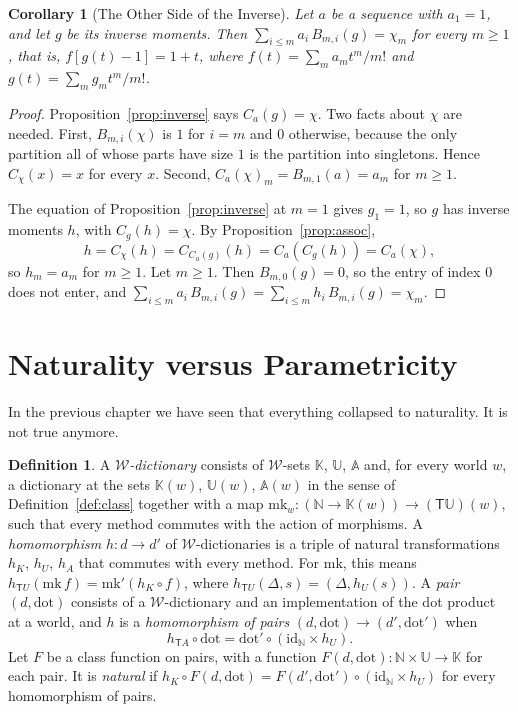 \documentclass[11pt,a4paper]{report}
\theoremstyle{plain}
\newtheorem{corollary}[theorem]{Corollary}
\theoremstyle{definition}
\newtheorem{definition}[theorem]{Definition}
\theoremstyle{remark}
\newcommand{\sK}{\mathbb{K}}
\newcommand{\sU}{\mathbb{U}}
\newcommand{\sA}{\mathbb{A}}
\newcommand{\NN}{\mathbb{N}}
\newcommand{\T}{\mathsf{T}}
\newcommand{\W}{\mathcal{W}}
\newcommand{\mk}{\mathrm{mk}}
\begin{document}
\begin{corollary}[The Other Side of the Inverse]
\label{cor:inverse-right}
Let $a$ be a sequence with $a_1 = 1$, and let $g$ be its inverse moments. Then
$\sum_{i \leq m} a_i\, B_{m,i}(g) = \chi_m$ for every $m \geq 1$, that is,
$f[g(t) - 1] = 1 + t$, where $f(t) = \sum_m a_m t^m / m!$ and
$g(t) = \sum_m g_m t^m / m!$.
\end{corollary}

\begin{proof}
Proposition~\ref{prop:inverse} says $C_a(g) = \chi$. Two facts about $\chi$ are
needed. First, $B_{m,i}(\chi)$ is $1$ for $i = m$ and $0$ otherwise, because the
only partition all of whose parts have size $1$ is the partition into singletons.
Hence $C_\chi(x) = x$ for every $x$. Second, $C_a(\chi)_m = B_{m,1}(a) = a_m$ for
$m \geq 1$.

The equation of Proposition~\ref{prop:inverse} at $m = 1$ gives $g_1 = 1$, so $g$
has inverse moments $h$, with $C_g(h) = \chi$. By Proposition~\ref{prop:assoc},
\[
  h = C_\chi(h) = C_{C_a(g)}(h) = C_a(C_g(h)) = C_a(\chi) ,
\]
so $h_m = a_m$ for $m \geq 1$. Let $m \geq 1$. Then $B_{m,0}(g) = 0$, so the entry
of index $0$ does not enter, and
$\sum_{i \leq m} a_i\, B_{m,i}(g) = \sum_{i \leq m} h_i\, B_{m,i}(g) = \chi_m$.
\end{proof}

\section{Naturality versus Parametricity}
\label{sec:separation}

In the previous chapter we have seen that everything collapsed to naturality. It 
is not true anymore.

\begin{definition}
\label{def:wdict}
A \emph{$\W$-dictionary} consists of $\W$-sets $\sK$, $\sU$, $\sA$ and, for
every world $w$, a dictionary at the sets $\sK(w)$, $\sU(w)$, $\sA(w)$ in the sense
of Definition~\ref{def:class} together with a map
$\mk_w : (\NN \to \sK(w)) \to (\T\sU)(w)$, such that every method commutes with
the action of morphisms. A \emph{homomorphism} $h : d \to d'$ of $\W$-dictionaries is a triple of
natural transformations $h_K$, $h_U$, $h_A$ that commutes with every method. For
$\mk$, this means $h_{\T U}(\mk\, f) = \mk'(h_K \circ f)$, where
$h_{\T U}(\Delta, s) = (\Delta, h_U(s))$. A \emph{pair} $(d, \mathrm{dot})$
consists of a $\W$-dictionary and an implementation of the dot product at a
world, and $h$ is a \emph{homomorphism of pairs}
$(d, \mathrm{dot}) \to (d', \mathrm{dot}')$ when
\[
  h_{\T A} \circ \mathrm{dot} = \mathrm{dot}' \circ (\mathrm{id}_\NN \times h_U) .
\]
Let $F$ be a class function on pairs, with a function
$F(d, \mathrm{dot}) : \NN \times \sU \to \sK$ for each pair. It is \emph{natural} if $h_K \circ F(d, \mathrm{dot}) =
F(d', \mathrm{dot}') \circ (\mathrm{id}_\NN \times h_U)$ for every homomorphism of
pairs.
\end{definition}
\end{document}
